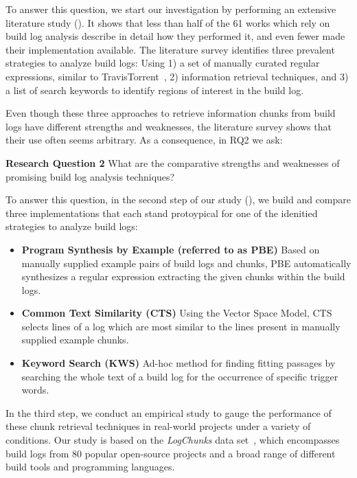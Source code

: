 To answer this question, we start our investigation by performing an
extensive literature study ().
It shows that
less than half of the 61 works which rely on build log analysis
describe in detail how they performed it, and even fewer
made their implementation available.
The literature
survey identifies three prevalent strategies to
analyze build logs: Using 1) a set of
manually curated regular expressions,
similar to TravisTorrent~\cite{beller2017oops},
2) information
retrieval techniques,
and 3) a list of search keywords
to identify regions of interest in the build log.

Even though these three approaches to retrieve information chunks from
build logs have different strengths and weaknesses, the literature
survey shows that their use often seems arbitrary.
As a consequence,
in RQ2 we ask:

\begin{simplebox}[minipage boxed title*=-5cm]{\textbf{Research Question
2}}
What are the comparative strengths and weaknesses
of promising build log analysis techniques?
\end{simplebox}

To answer this question, in the second step of our study
(), we build and compare three
implementations that each stand protoypical for one of the idenitied
strategies to analyze build logs:

\begin{itemize}
  \item \textbf{Program Synthesis by Example (referred to as PBE)}
  Based on manually supplied example pairs of build logs and chunks,
  PBE automatically
  synthesizes
  a regular expression extracting the given chunks within the build logs.
  \item \textbf{Common Text Similarity (CTS)}
  Using the Vector Space Model, CTS selects lines of a log which are
  most similar to the lines present in manually supplied example chunks.
  \item \textbf{Keyword Search (KWS)}
  Ad-hoc method for finding fitting passages by searching the whole
  text of a build log for
  the occurrence of specific trigger words.
\end{itemize}


In the third step, we conduct an empirical study to gauge the performance
of
these chunk retrieval techniques in
real-world projects under a variety of conditions.
Our study is based on the \emph{LogChunks} data
set~\cite{brandt2020logchunks}, which encompasses build logs from
80 popular open-source projects and a broad range of different
build tools and programming languages.


